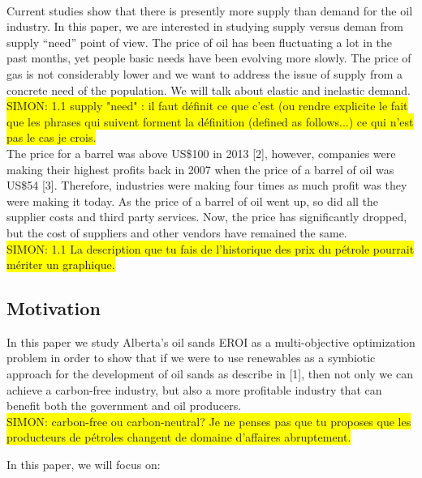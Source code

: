\documentclass[12pt]{article}
\newcommand{\h}[1]{\colorbox{yellow}{#1}}
\begin{document}
\\

Current studies show that there is presently more supply than demand for the oil industry. In this paper, we are interested in studying supply versus deman from supply ``need'' point of view. The price of oil has been fluctuating a lot in the past months, yet people basic needs have been evolving more slowly. The price of gas is not considerably lower and we want to address the issue of  supply from a concrete need of the population. We will talk about elastic and inelastic demand. \\

\h{SIMON: 1.1 supply "need" : il faut définit ce que c'est (ou rendre explicite le fait que les phrases qui suivent forment la définition (defined as follows...) ce qui n'est pas le cas je crois.} \\

The price for a barrel was above US\$100 in 2013 [2], however, companies were making their highest profits back in 2007 when the price of a barrel of oil was US\$54 [3]. Therefore, industries were making four times as much profit was they were making it today. As the price of a barrel of oil went up, so did all the supplier costs and third party services. Now, the price has significantly dropped, but the cost of suppliers and other vendors have remained the same. \\

\h{SIMON: 1.1 La description que tu fais de l'historique des prix du pétrole pourrait mériter un graphique.}

\subsection{Motivation}
In this paper we study Alberta's oil sands EROI as a multi-objective optimization problem in order to show that if we were to use renewables as a symbiotic approach for the development of oil sands as describe in [1], then not only we can achieve a carbon-free industry, but also a more profitable industry that can benefit both the government and oil producers. \\

\h{SIMON: carbon-free ou carbon-neutral? Je ne penses pas que tu proposes que les producteurs de pétroles changent de domaine d'affaires abruptement.}

In this paper, we will focus on: 
\end{document}
